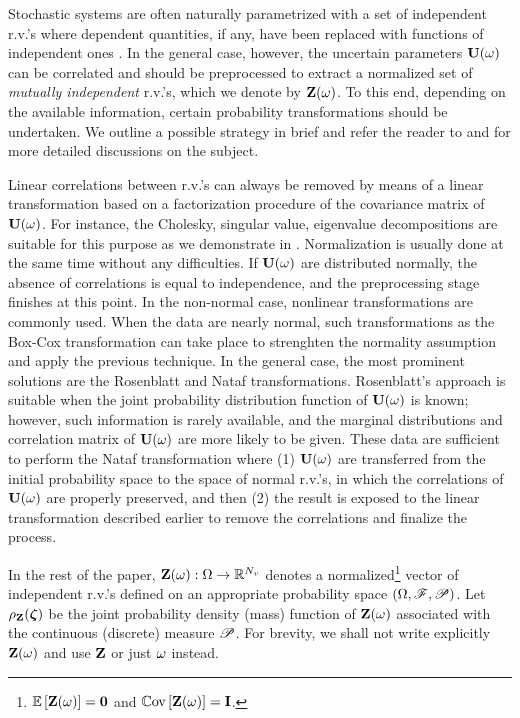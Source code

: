 Stochastic systems are often naturally parametrized with a set of independent r.v.'s where dependent quantities, if any, have been replaced with functions of independent ones \cite{xiu2009}. In the general case, however, the uncertain parameters $\mathbf{U}(\omega)$ can be correlated and should be preprocessed to extract a normalized set of \emph{mutually independent} r.v.'s, which we denote by $\mathbf{Z}(\omega)$. To this end, depending on the available information, certain probability transformations should be undertaken. We outline a possible strategy in brief and refer the reader to \cite{eldred2009} and \cite{xiu2009} for more detailed discussions on the subject.

Linear correlations between r.v.'s can always be removed by means of a linear transformation based on a factorization procedure of the covariance matrix of $\mathbf{U}(\omega)$. For instance, the Cholesky, singular value, eigenvalue decompositions \cite{press2007} are suitable for this purpose as we demonstrate in . Normalization is usually done at the same time without any difficulties. If $\mathbf{U}(\omega)$ are distributed normally, the absence of correlations is equal to independence, and the preprocessing stage finishes at this point. In the non-normal case, nonlinear transformations are commonly used. When the data are nearly normal, such transformations as the Box-Cox transformation \cite{box1964} can take place to strenghten the normality assumption and apply the previous technique. In the general case, the most prominent solutions are the Rosenblatt \cite{rosenblatt1952} and Nataf \cite{hongshuang2008} transformations. Rosenblatt's approach is suitable when the joint probability distribution function of $\mathbf{U}(\omega)$ is known; however, such information is rarely available, and the marginal distributions and correlation matrix of $\mathbf{U}(\omega)$ are more likely to be given. These data are sufficient to perform the Nataf transformation where (1) $\mathbf{U}(\omega)$ are transferred from the initial probability space to the space of normal r.v.'s, in which the correlations of $\mathbf{U}(\omega)$ are properly preserved, and then (2) the result is exposed to the linear transformation described earlier to remove the correlations and finalize the process.

In the rest of the paper, $\mathbf{Z}(\omega): \Omega \to \mathbb{R}^{N_v}$ denotes a normalized\footnote{$\oExp{\vZ(\o)} = \mZero$ and $\oCov{\vZ(\o)} = \mI$.} vector of independent r.v.'s defined on an appropriate probability space $(\Omega, \mathscr{F}, \mathscr{P})$. Let $\rho_{\mathbf{Z}}(\boldsymbol{\zeta})$ be the joint probability density (mass) function of $\mathbf{Z}(\omega)$ associated with the continuous (discrete) measure $\mathscr{P}$. For brevity, we shall not write explicitly $\mathbf{Z}(\omega)$ and use $\mathbf{Z}$ or just $\omega$ instead.

